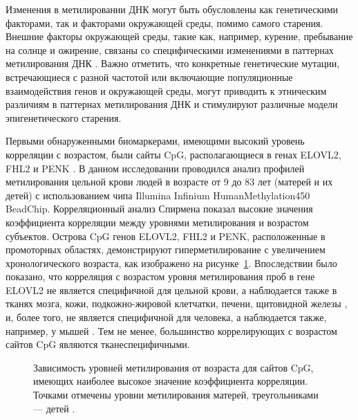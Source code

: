 Изменения в метилировании ДНК могут быть обусловлены как генетическими факторами, так и факторами окружающей среды, помимо самого старения. Внешние факторы окружающей среды, такие как, например, курение, пребывание на солнце и ожирение, связаны со специфическими изменениями в паттернах метилирования ДНК \autocite{Gronniger2010, Breitling2011, Almen2014, Vandiver2015}. Важно отметить, что конкретные генетические мутации, встречающиеся с разной частотой или включающие популяционные взаимодействия генов и окружающей среды, могут приводить к этническим различиям в паттернах метилирования ДНК \autocite{Galanter2017, Fagny2015, Heyn2013} и стимулируют различные модели эпигенетического старения. 

Первыми обнаруженными биомаркерами, имеющими высокий уровень корреляции с возрастом, были сайты CpG, располагающиеся в генах ELOVL2, FHL2 и PENK \autocite{Garagnani2012}. В данном исследовании проводился анализ профилей метилирования цельной крови людей в возрасте от 9 до 83 лет (матерей и их детей) с использованием чипа Illumina Infinium HumanMethylation450 BeadChip. Корреляционный анализ Спирмена показал высокие значения коэффициента корреляции между уровнями метилирования и возрастом субъектов. Острова CpG генов ELOVL2, FHL2 и PENK, расположенные в промоторных областях, демонстрируют гиперметилирование с увеличением хронологического возраста, как изображено на рисунке~\cref{fig:ELOVL2}. Впоследствии было показано, что корреляция с возрастом уровня метилирования проб в гене ELOVL2 не является специфичной для цельной крови, а наблюдается также в тканях мозга, кожи, подкожно-жировой клетчатки, печени, щитовидной железы \autocite{Slieker2018}, и, более того, не является специфичной для человека, а наблюдается также, например, у мышей \autocite{Spiers2016}. Тем не менее, большинство коррелирующих с возрастом сайтов CpG являются тканеспецифичными.

\begin{figure}[ht]
	\caption[Зависимость уровней метилирования от возраста для сайтов CpG, имеющих наиболее высокое значение коэффициента корреляции.]{Зависимость уровней метилирования от возраста для сайтов CpG, имеющих наиболее высокое значение коэффициента корреляции. Точками отмечены уровни метилирования матерей, треугольниками --- детей \autocite{Garagnani2012}.}\label{fig:ELOVL2}
\end{figure}


